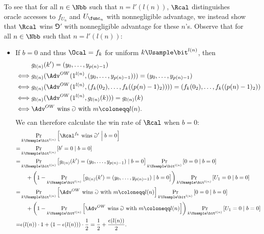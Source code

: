 \begin{answer}[a]
    To see that for all $n\in\Nbb$ such that $n=l'(l(n))$, $\Rcal$ distinguishes oracle accesses to $f_{U_n}$ and $U_{\func_n}$ with nonnegligible advantage, we instead show that $\Rcal$ wins $\Game'$ with nonnegligible advantage for these $n$'s. Observe that  for all $n\in\Nbb$ such that $n=l'(l(n))$: 
    \begin{itemize}
        \item If $b=0$ and thus $\Ocal = f_k$ for uniform $k\Usample\bit^{l(n)}$, then
        \begin{align*}
            &g_{l(n)}(k')=(y_0,\ldots,y_{p(n)-1})  \\
            \iff& g_{l(n)}(\Adv^{OW}(1^{l(n)},(y_0,\ldots,y_{p(n)-1})))=(y_0,\ldots,y_{p(n)-1}) \\
            \iff& g_{l(n)}(\Adv^{OW}(1^{l(n)}, (f_k(0_2),\ldots,f_k((p(n)-1)_2))))= (f_k(0_2),\ldots,f_k((p(n)-1)_2)) \\
            \iff& g_{l(n)}(\Adv^{OW}(1^{l(n)},g_{l(n)}(k)))= g_{l(n)}(k) \\
            \iff& \Adv^{OW} \textrm{ wins } \Game \textrm{ with } m\coloneqq l(n).
        \end{align*}
        We can therefore calculate the win rate of $\Rcal$ when $b=0$:
        \begin{align*}
            &\Pr_{k\Usample\bit^{l(n)}}\left[ \Rcal^{f_k} \textrm{ wins } \Game' \Bigm\vert b=0\right]\\
            =& \Pr_{k\Usample\bit^{l(n)}}\left[ b' =0 \mid b=0\right]\\
            =& \Pr_{k\Usample\bit^{l(n)}}\left[ g_{l(n)}(k')=(y_0,\ldots,y_{p(n)-1}) \mid b=0 \right]\Pr_{k\Usample\bit^{l(n)}}\left[ 0=0 \mid b=0\right]\\
            &\quad +\left(1-\Pr_{k\Usample\bit^{l(n)}}\left[ g_{l(n)}(k')=(y_0,\ldots,y_{p(n)-1}) \mid b=0 \right]\right)\Pr_{k\Usample\bit^{l(n)}}\left[U_1=0 \mid  b=0\right]\\
            =& \Pr_{k\Usample\bit^{l(n)}}\left[ \Adv^{OW} \textrm{ wins } \Game \textrm{ with } m\coloneqq l(n) \right]\Pr_{k\Usample\bit^{l(n)}}\left[ 0=0 \mid b=0\right]\\
            &\quad +\left(1-\Pr_{k\Usample\bit^{l(n)}}\left[ \Adv^{OW} \textrm{ wins } \Game \textrm{ with } m\coloneqq l(n) \right]\right)\Pr_{k\Usample\bit^{l(n)}}\left[U_1=0 \mid  b=0\right]\\
            =& \epsilon(l(n))\cdot 1+(1-\epsilon(l(n)))\cdot \frac{1}{2}
            = \frac{1}{2}+\frac{\epsilon(l(n))}{2}.
        \end{align*}


\end{itemize}
\end{answer}
